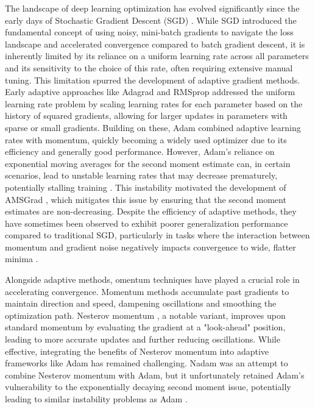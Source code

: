 \documentclass{article}
\begin{document}
The landscape of deep learning optimization has evolved significantly since the early days of Stochastic Gradient Descent (SGD) \cite{Robbins1951}. While SGD introduced the fundamental concept of using noisy, mini-batch gradients to navigate the loss landscape and accelerated convergence compared to batch gradient descent, it is inherently limited by its reliance on a uniform learning rate across all parameters and its sensitivity to the choice of this rate, often requiring extensive manual tuning. This limitation spurred the development of adaptive gradient methods. Early adaptive approaches like Adagrad \cite{Duchi2011} and RMSprop \cite{Tieleman2012} addressed the uniform learning rate problem by scaling learning rates for each parameter based on the history of squared gradients, allowing for larger updates in parameters with sparse or small gradients. Building on these, Adam \cite{kingma2014adam} combined adaptive learning rates with momentum, quickly becoming a widely used optimizer due to its efficiency and generally good performance. However, Adam's reliance on exponential moving averages for the second moment estimate can, in certain scenarios, lead to unstable learning rates that may decrease prematurely, potentially stalling training \cite{Reddi2018}. This instability motivated the development of AMSGrad \cite{Reddi2018}, which mitigates this issue by ensuring that the second moment estimates are non-decreasing. Despite the efficiency of adaptive methods, they have sometimes been observed to exhibit poorer generalization performance compared to traditional SGD, particularly in tasks where the interaction between momentum and gradient noise negatively impacts convergence to wide, flatter minima \cite{Wilson2017}.

Alongside adaptive methods, omentum techniques have played a crucial role in accelerating convergence. Momentum methods accumulate past gradients to maintain direction and speed, dampening oscillations and smoothing the optimization path. Nesterov momentum \cite{nesterov1983method}, a notable variant, improves upon standard momentum by evaluating the gradient at a "look-ahead" position, leading to more accurate updates and further reducing oscillations. While effective, integrating the benefits of Nesterov momentum into adaptive frameworks like Adam has remained challenging. Nadam \cite{Dozat2016} was an attempt to combine Nesterov momentum with Adam, but it unfortunately retained Adam's vulnerability to the exponentially decaying second moment issue, potentially leading to similar instability problems as Adam \cite{Reddi2018}.
\end{document}
